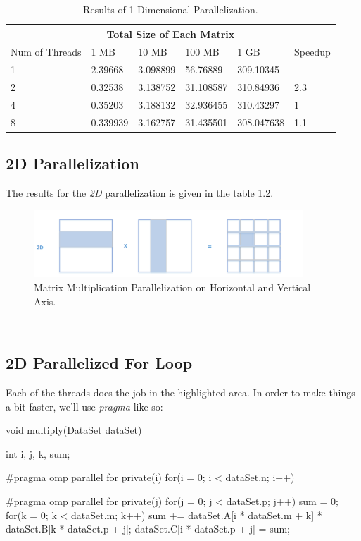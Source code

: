 \documentclass[12pt]{article}
\numberwithin{equation}{section}
\numberwithin{table}{section}
\numberwithin{figure}{section}
\begin{document}
\def\arraystretch{1.3}
\begin{table}[!h]
		\centering
\begin{tabular}{ |p{3cm}||p{2cm}|p{2cm}|p{2cm}|p{2cm}|p{1.5cm}|  }
	
	\hline
	\multicolumn{6}{|c|}{Total Size of Each Matrix} \\
	\hline
	 Num of Threads & 1 MB & 10 MB & 100 MB & 1 GB & Speedup\\
	\hline
		1   & 2.39668    &3.098899 &   56.76889 &   309.10345&   -\\
		2   & 0.32538    &3.138752  &  31.108587 &   310.84936 &   2.3\\
		4   & 0.35203    &3.188132 &   32.936455 &   310.43297&   1\\
		8   & 0.339939    &3.162757&   31.435501 &   308.047638&   1.1\\
	\hline
\end{tabular}
	\caption{Results of 1-Dimensional Parallelization.}
\label{figsolplot}
\end{table}
\newpage
\subsection{2D Parallelization}
The results for the \textit{2D} parallelization is given in the table 1.2.
\begin{figure}[!h]\centering
	\includegraphics[width=0.9\textwidth]{two_dimensional.png}
	\caption{Matrix Multiplication Parallelization on Horizontal and Vertical Axis.}
	\label{figsolplot}
\end{figure}\\
\subsection{2D Parallelized For Loop}
Each of the threads does the job in the highlighted area.
In order to make things a bit faster, we'll use \textit{pragma} like so:
\begin{cpp}
		void multiply(DataSet dataSet){
			int i, j, k, sum;
			
			#pragma omp parallel for private(i)
			for(i = 0; i < dataSet.n; i++){
				
				#pragma omp parallel for private(j)
				for(j = 0; j < dataSet.p; j++){
					sum = 0;
					for(k = 0; k < dataSet.m; k++){
						sum += dataSet.A[i * dataSet.m + k] * dataSet.B[k * dataSet.p + j];
					}
					dataSet.C[i * dataSet.p + j] = sum;
				}
			}
		}
\end{cpp}
\end{document}
